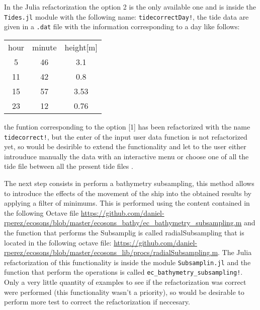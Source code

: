 \documentclass{article}[a4paper, 12pt]
\begin{document}
In the Julia refactorization the option 2 is the only available one and is inside the \texttt{Tides.jl} module with the following name: \texttt{tidecorrectDay!}, the tide data are given in a \texttt{.dat} file with the information corresponding to a day like follows:
  
\begin{table}[h!]
    \centering
    \begin{tabular}{ |c|c|c| }
     hour  & minute & height[m] \\ 
     5 & 46 & 3.1\\ 
     11 & 42 & 0.8 \\ 
     15 & 57 & 3.53 \\ 
     23 & 12 & 0.76 \\ 
     
    \end{tabular}
\end{table}

the funtion corresponding to the option [1] has been refactorized with the name \texttt{tidecorrect!}, but the enter of the input user data function is not refactorized yet, so would be desirible to extend the functionality and let to the user either introuduce manually the data with an interactive menu or choose one of all the tide file between all the present tide files .

\vspace{1cm}

The next step consists in perform a bathymetry subsampling, this method allows to introduce the effects of the movement of the ship into the obtained results by applying a filter of minimums. This is performed using the content contained in the following Octave file \url{https://github.com/daniel-rperez/ecosons/blob/master/ecosons_bathy/ec_bathymetry_subsampling.m} and the function that performs the Subsamplig is called radialSubsampling that is located in the following octave file: \url{https://github.com/daniel-rperez/ecosons/blob/master/ecosons_lib/procs/radialSubsampling.m}. The Julia refactorization of this functionality is inside the module \texttt{Subsamplin.jl} and the function that perform the operations is called \texttt{ec\_bathymetry\_subsampling!}. Only a very little quantity of examples to see if the refactorization was correct were performed (this functionality wasn't a priority), so would be desirable to perform more test to correct the refactorization if neccesary.
\end{document}
